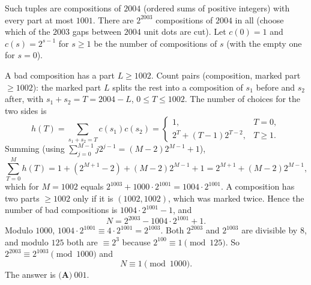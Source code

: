 Such tuples are compositions of $2004$ (ordered sums of positive integers) with every part at most $1001$. There are $2^{2003}$ compositions of $2004$ in all (choose which of the $2003$ gaps between $2004$ unit dots are cut). Let $c(0)=1$ and $c(s)=2^{s-1}$ for $s\ge1$ be the number of compositions of $s$ (with the empty one for $s=0$).

A bad composition has a part $L\ge1002$. Count pairs (composition, marked part $\ge1002$): the marked part $L$ splits the rest into a composition of $s_1$ before and $s_2$ after, with $s_1+s_2=T=2004-L$, $0\le T\le1002$. The number of choices for the two sides is
\[h(T)=\sum_{s_1+s_2=T}c(s_1)c(s_2)=\begin{cases}1,&T=0,\\ 2^T+(T-1)2^{T-2},&T\ge1.\end{cases}\]
Summing (using $\sum_{j=0}^{M-1}j2^{j-1}=(M-2)2^{M-1}+1$),
\[\sum_{T=0}^{M}h(T)=1+(2^{M+1}-2)+(M-2)2^{M-1}+1=2^{M+1}+(M-2)2^{M-1},\]
which for $M=1002$ equals $2^{1003}+1000\cdot2^{1001}=1004\cdot2^{1001}$. A composition has two parts $\ge1002$ only if it is $(1002,1002)$, which was marked twice. Hence the number of bad compositions is $1004\cdot2^{1001}-1$, and
\[N=2^{2003}-1004\cdot2^{1001}+1 .\]
Modulo $1000$, $1004\cdot2^{1001}\equiv4\cdot2^{1001}=2^{1003}$. Both $2^{2003}$ and $2^{1003}$ are divisible by $8$, and modulo $125$ both are $\equiv2^3$ because $2^{100}\equiv1\pmod{125}$. So $2^{2003}\equiv2^{1003}\pmod{1000}$ and
\[N\equiv1\pmod{1000}.\]
The answer is $\boxed{\textbf{(A)}\ 001}$.
